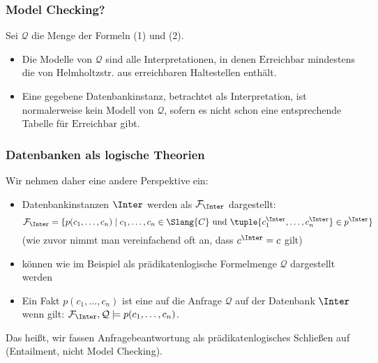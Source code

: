 \documentclass[aspectratio=1610,onlymath]{beamer}
\begin{document}
\begin{frame}\frametitle{Model Checking?}

\medskip

Sei $\mathcal{Q}$ die Menge der Formeln (1) und (2). \pause
\begin{itemize}
\item Die Modelle von $\mathcal{Q}$ sind alle Interpretationen, in denen $\text{Erreichbar}$ \alert{mindestens} die von Helmholtzstr. aus erreichbaren Haltestellen enthält.
\item Eine gegebene Datenbankinstanz, betrachtet als Interpretation, ist normalerweise kein Modell von $\mathcal{Q}$, sofern es nicht schon eine entsprechende Tabelle für $\text{Erreichbar}$ gibt.
\end{itemize}

\end{frame}

\begin{frame}\frametitle{Datenbanken als logische Theorien}

Wir nehmen daher eine andere Perspektive ein:
\begin{itemize}
\item Datenbankinstanzen $\Inter$ werden als  $\mathcal{F}_\Inter$ dargestellt:
\[ \mathcal{F}_\Inter= \{ p(c_1,\ldots,c_n)\mid c_1,\ldots,c_n\in\Slang{C}\text{ und }\tuple{c_1^\Inter,\ldots,c_n^\Inter}\in p^\Inter\}\]
\textcolor{devilscss}{(wie zuvor nimmt man vereinfachend oft an, dass $c^\Inter=c$ gilt)}
\item {} können wie im Beispiel als prädikatenlogische Formelmenge $\mathcal{Q}$ dargestellt werden
\item Ein Fakt $p(c_1,\ldots,c_n)$ ist eine  auf die Anfrage $\mathcal{Q}$ auf der Datenbank $\Inter$ wenn gilt: $\mathcal{F}_\Inter,\mathcal{Q}\models p(c_1,\ldots,c_n)$.
\end{itemize}
Das heißt, wir fassen \alert{Anfragebeantwortung als prädikatenlogisches Schließen} auf (Entailment, nicht Model Checking).

\end{frame}
\end{document}
